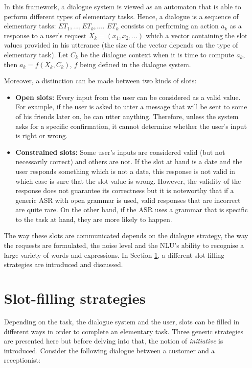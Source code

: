 	In this framework, a dialogue system is viewed as an automaton that is able to perform different types of elementary tasks. Hence, a dialogue is a sequence of elementary tasks: $ET_1,...,ET_k,...$. $ET_k$ consists on performing an action $a_k$ as a response to a user's request $X_k = (x_1, x_2, ...)$ which a vector containing the slot values provided in his utterance (the size of the vector depends on the type of elementary task). Let $C_k$ be the dialogue context when it is time to compute $a_k$, then $a_k = f(X_k,C_k)$, $f$ being defined in the dialogue system.
	
	Moreover, a distinction can be made between two kinds of slots:
	
	\begin{itemize}
		\item \textbf{Open slots:} Every input from the user can be considered as a valid value. For example, if the user is asked to utter a message that will be sent to some of his friends later on, he can utter anything. Therefore, unless the system asks for a specific confirmation, it cannot determine whether the user's input is right or wrong.
		\item \textbf{Constrained slots:} Some user's inputs are considered valid (but not necessarily correct) and others are not. If the slot at hand is a date and the user responds something which is not a date, this response is not valid in which case is sure that the slot value is wrong. However, the validity of the response does not guarantee its correctness but it is noteworthy that if a generic ASR with open grammar is used, valid responses that are incorrect are quite rare. On the other hand, if the ASR uses a grammar that is specific to the task at hand, they are more likely to happen.
	\end{itemize}
	
	The way these slots are communicated depends on the dialogue strategy, the way the requests are formulated, the noise level and the NLU's ability to recognise a large variety of words and expressions. In Section \ref{sec:slotfillstrat}, a different slot-filling strategies are introduced and discussed.

\section{Slot-filling strategies}
\label{sec:slotfillstrat}

	Depending on the task, the dialogue system and the user, slots can be filled in different ways in order to complete an elementary task. Three generic strategies are presented here but before delving into that, the notion of \textit{initiative} is introduced. Consider the following dialogue between a customer and a receptionist:
	
